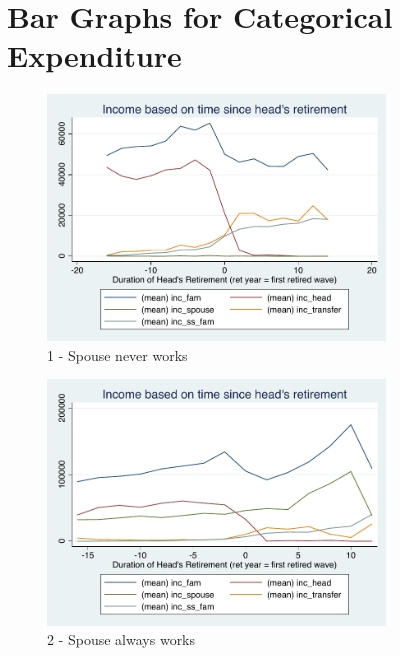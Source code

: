 \documentclass[11pt,onecolumn]{article}
\begin{document}
\section{Bar Graphs for Categorical Expenditure}

\begin{figure}[h]
	\caption{1 - Spouse never works}
	\centering
	\includegraphics[width=0.8\textwidth]{../IncomeAroundRetirement/Income_with_spouse_definition_1.pdf}
\end{figure}

\begin{figure}[h]
	\caption{2 - Spouse always works}
	\centering
	\includegraphics[width=0.8\textwidth]{../IncomeAroundRetirement/Income_with_spouse_definition_2.pdf}
\end{figure}
\end{document}
